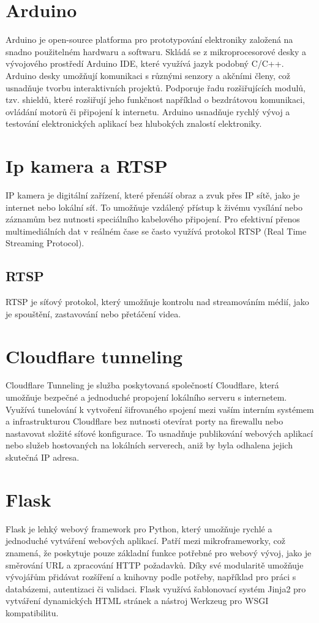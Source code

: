 \section{Arduino}\label{sec:arduino}
Arduino je open-source platforma pro prototypování elektroniky založená na snadno použitelném hardwaru a softwaru.
Skládá se z mikroprocesorové desky a vývojového prostředí Arduino IDE, které využívá jazyk podobný C/C++.
Arduino desky umožňují komunikaci s různými senzory a akčními členy, což usnadňuje tvorbu interaktivních projektů.
Podporuje řadu rozšiřujících modulů, tzv. shieldů, které rozšiřují jeho funkčnost například o bezdrátovou komunikaci, ovládání motorů či připojení k internetu.
Arduino usnadňuje rychlý vývoj a testování elektronických aplikací bez hlubokých znalostí elektroniky.


\section{Ip kamera a RTSP}\label{sec:ipcamera-rtsp}
IP kamera je digitální zařízení, které přenáší obraz a zvuk přes IP sítě, jako je internet nebo lokální síť.
To umožňuje vzdálený přístup k živému vysílání nebo záznamům bez nutnosti speciálního kabelového připojení.
Pro efektivní přenos multimediálních dat v reálném čase se často využívá protokol RTSP (Real Time Streaming Protocol).

\subsection{RTSP}\label{sec:rtsp}
RTSP je síťový protokol, který umožňuje kontrolu nad streamováním médií, jako je spouštění, zastavování nebo přetáčení videa.


\section{Cloudflare tunneling}\label{sec:cf-tunnel}
Cloudflare Tunneling je služba poskytovaná společností Cloudflare, která umožňuje bezpečné a jednoduché propojení lokálního serveru s internetem.
Využívá tunelování k vytvoření šifrovaného spojení mezi vaším interním systémem a infrastrukturou Cloudflare bez nutnosti otevírat porty na firewallu nebo nastavovat složité síťové konfigurace.
To usnadňuje publikování webových aplikací nebo služeb hostovaných na lokálních serverech, aniž by byla odhalena jejich skutečná IP adresa.


\section{Flask}\label{sec:flask}
Flask je lehký webový framework pro Python, který umožňuje rychlé a jednoduché vytváření webových aplikací.
Patří mezi mikroframeworky, což znamená, že poskytuje pouze základní funkce potřebné pro webový vývoj, jako je směrování URL a zpracování HTTP požadavků.
Díky své modularitě umožňuje vývojářům přidávat rozšíření a knihovny podle potřeby, například pro práci s databázemi, autentizaci či validaci.
Flask využívá šablonovací systém Jinja2 pro vytváření dynamických HTML stránek a nástroj Werkzeug pro WSGI kompatibilitu.


